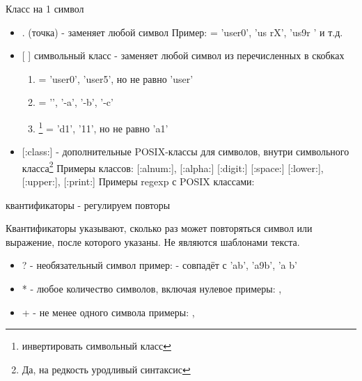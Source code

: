 \begin{frame}{Класс на 1 символ}
  \begin{itemize}
    \item \alert{.} (точка)  - заменяет любой символ \newline
      Пример:  = 'user0', 'us rX', 'us9r ' и т.д. \pause
    \item \alert{[ ]} символьный класс - заменяет любой символ из перечисленных в скобках
      \begin{enumerate}
        \item {} = 'user0', 'user5', но не равно 'user'
        \item \regex{-[abc-]} = '\textendash\textendash', '-a', '-b', '-c'
        \item {}\footnote{инвертировать символьный класс} = 'd1', '11', но не равно 'a1'
      \end{enumerate} \pause
    \item \alert{[:class:]} - дополнительные POSIX-классы для символов, \alert{внутри символьного класса}\footnote{Да, на редкость уродливый синтаксис} \newline
        Примеры классов: \alert{[:alnum:]}, \alert{[:alpha:]} \alert{[:digit:]} \alert{[:space:]} \alert{[:lower:]}, \alert{[:upper:]}, \alert{[:print:]} \newline
        Примеры regexp с POSIX классами: \regex{[ы[:digit:]]}
  \end{itemize}
\end{frame}


\begin{frame}[fragile]{квантификаторы - регулируем повторы}

  \alert{Квантификаторы} указывают, сколько раз может повторяться символ или выражение, после которого указаны.  Не являются шаблонами текста.

  \begin{itemize}
    \item \alert{?} - необязательный символ \newline
      пример:  - совпадёт с 'ab', 'a9b', 'a b' \pause
    \item \alert{*} - любое количество символов, включая нулевое \newline
      примеры: , \regex{[[:digit:]]*} \pause
    \item \alert{+} - не менее одного символа \newline
      примеры: \regex{[a-d]+}, 
  \end{itemize}
\end{frame}
